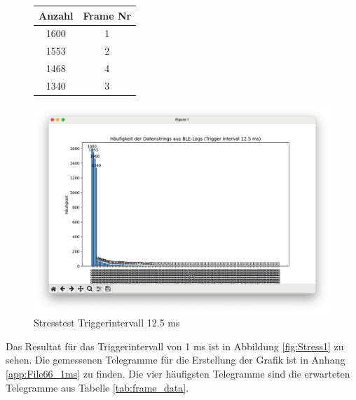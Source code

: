 \begin{figure}[H]
    \centering
    \begin{minipage}{0.29 \textwidth}
        \begin{tabular}{c||c}
            \toprule
            \textbf{Anzahl} & \textbf{Frame Nr} \\ 
            \midrule
            1600 & 1\\
            1553 & 2\\
            1468 & 4\\
            1340 & 3\\
            \bottomrule
        \end{tabular}
    \end{minipage}
    \hfill
    \begin{minipage}{0.7 \textwidth}
        \includegraphics[width=\linewidth]{Figures/Chap4/Stesstest/Stress_12_5.png}
    \caption{Stresstest Triggerintervall 12.5 ms}
    \label{fig:Stress12_5}
    \end{minipage}
\end{figure}

\newpage

Das Resultat für das Triggerintervall von 1 ms ist in Abbildung \ref{fig:Stress1} zu sehen. Die gemessenen Telegramme für die Erstellung der Grafik ist in Anhang \ref{app:File66_1ms} zu finden. Die vier häufigsten Telegramme sind die erwarteten Telegramme aus Tabelle \ref{tab:frame_data}.

